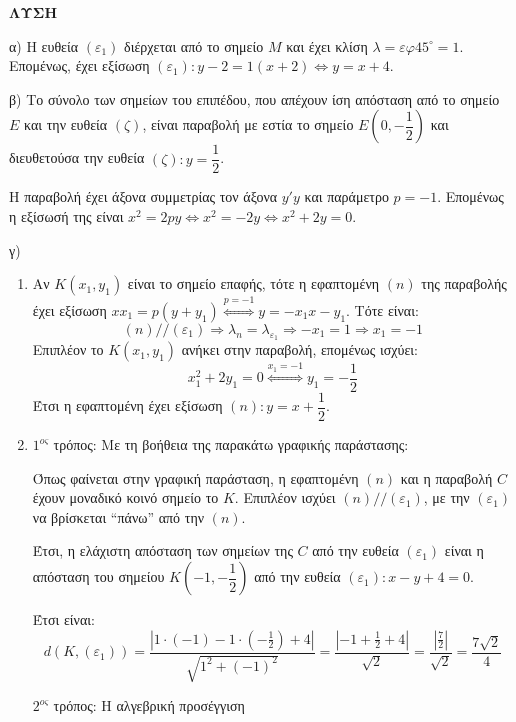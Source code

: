 \textbf{ΛΥΣΗ}

\noindent α) Η ευθεία $(\varepsilon_1)$ διέρχεται από το σημείο $M$ και έχει κλίση $\lambda = \varepsilon \varphi 45^\circ = 1$. Επομένως, έχει εξίσωση $(\varepsilon_1): y - 2 = 1(x + 2) \Leftrightarrow y = x + 4$.

\noindent β) Το σύνολο των σημείων του επιπέδου, που απέχουν ίση απόσταση από το σημείο $E$ και την ευθεία $(\zeta)$, είναι παραβολή με εστία το σημείο $E \left(0, -\dfrac{1}{2}\right)$ και διευθετούσα την ευθεία $(\zeta): y = \dfrac{1}{2}$.

\noindent Η παραβολή έχει άξονα συμμετρίας τον άξονα $y'y$ και παράμετρο $p = -1$.
Επομένως η εξίσωσή της είναι $x^2 = 2py \Leftrightarrow x^2 = -2y \Leftrightarrow x^2 + 2y = 0$.

\noindent γ)
\begin{enumerate}
    \item[i.] Αν $K(x_1, y_1)$ είναι το σημείο επαφής, τότε η εφαπτομένη $(n)$ της παραβολής έχει εξίσωση $xx_1 = p(y+y_1) \overset{p=-1}{\Leftrightarrow} y = -x_1 x - y_1$. Τότε είναι:
    \[ (n) // (\varepsilon_1) \Rightarrow \lambda_n = \lambda_{\varepsilon_1} \Rightarrow -x_1 = 1 \Rightarrow x_1 = -1 \]
    \noindent Επιπλέον το $K(x_1, y_1)$ ανήκει στην παραβολή, επομένως ισχύει:
    \[ x_1^2 + 2y_1 = 0 \overset{x_1=-1}{\Leftrightarrow} y_1 = -\dfrac{1}{2} \]
    \noindent Έτσι η εφαπτομένη έχει εξίσωση $(n): y = x + \dfrac{1}{2}$.

    \item[ii.] $1^{ος}$ τρόπος: Με τη βοήθεια της παρακάτω γραφικής παράστασης:


    \noindent Όπως φαίνεται στην γραφική παράσταση, η εφαπτομένη $(n)$ και η παραβολή $C$ έχουν μοναδικό κοινό σημείο το $K$. Επιπλέον ισχύει $(n) // (\varepsilon_1)$, με την $(\varepsilon_1)$ να βρίσκεται ``πάνω'' από την $(n)$.

    \noindent Έτσι, η ελάχιστη απόσταση των σημείων της $C$ από την ευθεία $(\varepsilon_1)$ είναι η απόσταση του σημείου $K \left(-1, -\dfrac{1}{2}\right)$ από την ευθεία $(\varepsilon_1): x - y + 4 = 0$.

    \noindent Έτσι είναι:
    \[ d(K, (\varepsilon_1)) = \frac{|1 \cdot (-1) - 1 \cdot (-\frac{1}{2}) + 4|}{\sqrt{1^2 + (-1)^2}} = \frac{|-1 + \frac{1}{2} + 4|}{\sqrt{2}} = \frac{|\frac{7}{2}|}{\sqrt{2}} = \frac{7\sqrt{2}}{4} \]

    \noindent $2^{ος}$ τρόπος: Η αλγεβρική προσέγγιση


\end{enumerate}
